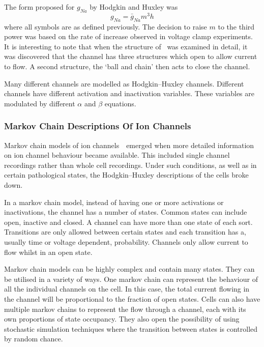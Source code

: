 The form proposed for $g_{Na}$ by Hodgkin and Huxley was
\begin{equation}
g_{Na}=\bar{g}_{Na}m^{3}h
\label{eqn:intro:math:gna}
\end{equation}
where all symbols are as defined previously.
The decision to raise $m$ to the third power was based on the rate of increase
observed in voltage clamp experiments.
It is interesting to note that when the structure of \ was examined in
detail, it was discovered that the channel has three structures which open to
allow current to flow.
A second structure, the `ball and chain' then acts to close the channel.

Many different channels are modelled as Hodgkin--Huxley channels.
Different channels have different activation and inactivation variables.
These variables are modulated by different $\alpha$ and $\beta$ equations.

\subsubsection{Markov Chain Descriptions Of Ion Channels}

Markov chain models of ion channels~\cite{Balser1990,Clancy1999,Silva2005}\
emerged when more detailed information on ion channel behaviour became
available.
This included single channel recordings rather than whole cell recordings.
Under such conditions, as well as in certain pathological states, the
Hodgkin--Huxley descriptions of the cells broke down.

In a markov chain model, instead of having one or more activations or
inactivations, the channel has a number of states.
Common states can include open, inactive and closed.
A channel can have more than one state of each sort.
Transitions are only allowed between certain states and each transition has a,
usually time or voltage dependent, probability.
Channels only allow current to flow whilst in an open state.

Markov chain models can be highly complex and contain many states.
They can be utilised in a variety of ways.
One markov chain can represent the behaviour of all the individual channels on
the cell.
In this case, the total current flowing in the channel will be proportional to
the fraction of open states.
Cells can also have multiple markov chains to represent the flow through a
channel, each with its own proportions of state occupancy.
They also open the possibility of using stochastic simulation techniques where
the transition between states is controlled by random chance.

